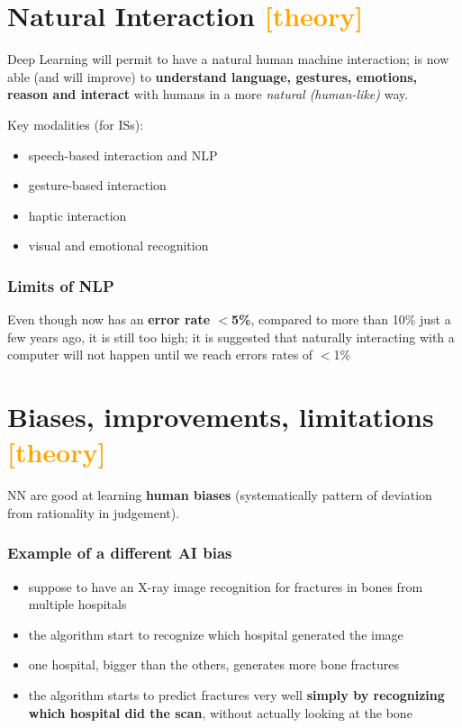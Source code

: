 \section{Natural Interaction \textcolor{orange}{[theory]}}
Deep Learning will permit to have a natural human machine interaction; is now able (and will improve)
to \textbf{understand language, gestures, emotions, reason and interact} with humans 
in a more \textit{natural (human-like)} way.

\noindent Key modalities (for ISs):
\begin{itemize}
    \item speech-based interaction and NLP 
    \item gesture-based interaction 
    \item haptic interaction 
    \item visual and emotional recognition
\end{itemize}

\subsubsection{Limits of NLP}
Even though now has an \textbf{error rate $<$5\%}, compared to more than 10\% just a few years 
ago, it is still too high; it is suggested that naturally interacting with a computer 
will not happen until we reach errors rates of $<$1\%

\section{Biases, improvements, limitations \textcolor{orange}{[theory]}}

NN are good at learning \textbf{human biases} (systematically pattern of 
deviation from rationality in judgement).

\subsubsection{Example of a different AI bias}
\begin{itemize}
    \item suppose to have an X-ray image recognition for fractures in bones from multiple hospitals 
    \item the algorithm start to recognize which hospital generated the image 
    \item one hospital, bigger than the others, generates more bone fractures
    \item the algorithm starts to predict fractures very well \textbf{simply by recognizing 
    which hospital did the scan}, without actually looking at the bone
\end{itemize}

